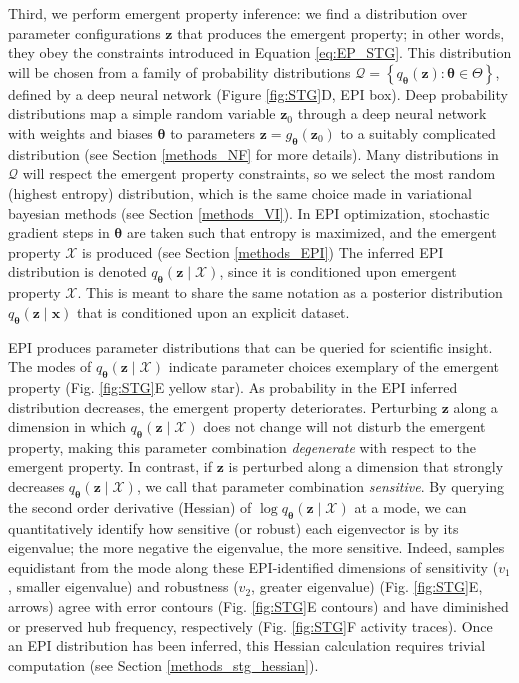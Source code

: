 \documentclass[11pt]{article}
\begin{document}
Third, we perform emergent property inference: we find a distribution over parameter configurations $\mathbf{z}$ that produces the emergent property; in other words, they obey the constraints introduced in Equation \ref{eq:EP_STG}.  
This distribution will be chosen from a family of probability distributions $\mathcal{Q} = \left\{ q_{\bm{\theta}}(\mathbf{z}) : \bm{\theta} \in \Theta \right\}$, defined by a deep neural network \cite{rezende2015variational, dinh2017density, papamakarios2017masked} (Figure \ref{fig:STG}D, EPI box).
Deep probability distributions map a simple random variable $\mathbf{z}_0$ through a deep neural network with weights and biases $\bm{\theta}$ to parameters $\mathbf{z} = g_{\bm{\theta}}(\mathbf{z}_0)$ to a suitably complicated distribution (see Section \ref{methods_NF} for more details).
Many distributions in $\mathcal{Q}$ will respect the emergent property constraints, so we select the most random (highest entropy) distribution, which is the same choice made in variational bayesian methods (see Section \ref{methods_VI}).
In EPI optimization, stochastic gradient steps in $\bm{\theta}$ are taken such that entropy is maximized, and the emergent property $\mathcal{X}$ is produced (see Section \ref{methods_EPI})
The inferred EPI distribution is denoted $q_{\bm{\theta}}(\mathbf{z} \mid \mathcal{X})$, since it is conditioned upon emergent property $\mathcal{X}$. 
This is meant to share the same notation as a posterior distribution $q_{\bm{\theta}}(\mathbf{z} \mid \mathbf{x})$ that is conditioned upon an explicit dataset.

EPI produces parameter distributions that can be queried for scientific insight.
The modes of $q_{\bm{\theta}}(\mathbf{z} \mid \mathcal{X})$ indicate parameter choices exemplary of the emergent property (Fig. \ref{fig:STG}E yellow star).
As probability in the EPI inferred distribution decreases, the emergent property deteriorates.
Perturbing $\mathbf{z}$ along a dimension in which $q_{\bm{\theta}}(\mathbf{z} \mid \mathcal{X})$ does not change will not disturb the emergent property, making this parameter combination \emph{degenerate} with respect to the emergent property.
In contrast, if $\mathbf{z}$ is perturbed along a dimension that strongly decreases $q_{\bm{\theta}}(\mathbf{z} \mid \mathcal{X})$, we call that parameter combination \emph{sensitive}.
By querying the second order derivative (Hessian) of $\log q_{\bm{\theta}}(\mathbf{z} \mid \mathcal{X})$ at a mode, we can quantitatively identify how sensitive (or robust) each eigenvector is by its eigenvalue; the more negative the eigenvalue, the more sensitive.
Indeed, samples equidistant from the mode along these EPI-identified dimensions of sensitivity ($v_1$, smaller eigenvalue) and robustness ($v_2$, greater eigenvalue) (Fig. \ref{fig:STG}E, arrows) agree with error contours (Fig. \ref{fig:STG}E contours) and have diminished or preserved hub frequency, respectively (Fig. \ref{fig:STG}F activity traces).
Once an EPI distribution has been inferred, this Hessian calculation requires trivial computation (see Section \ref{methods_stg_hessian}).
\end{document}
